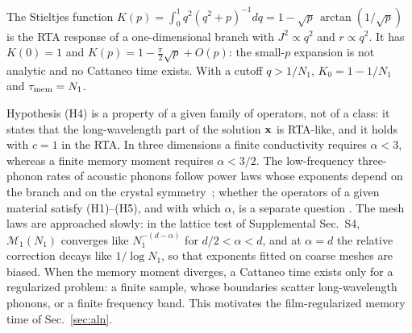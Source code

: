 \begin{example}\label{ex:ir}
The Stieltjes function
$K(p)=\int_0^1q^2(q^2+p)^{-1}dq=1-\sqrt p\,\arctan(1/\sqrt p)$ is the RTA response of a one-dimensional
branch with $J^2\propto q^2$ and $r\propto q^2$. It has $K(0)=1$ and $K(p)=1-\tfrac\pi2\sqrt p+O(p)$: the
small-$p$ expansion is not analytic and no Cattaneo time exists. With a cutoff $q>1/N_1$,
$K_0=1-1/N_1$ and $\tau_{\rm mem}=N_1$.
\end{example}

Hypothesis (H4) is a property of a given family of operators, not of a class: it states that the
long-wavelength part of the solution $\mathbf x$ is RTA-like, and it holds with $c=1$ in the RTA. In three
dimensions a finite conductivity requires $\alpha<3$, whereas a finite memory moment requires
$\alpha<3/2$. The low-frequency three-phonon rates of acoustic phonons follow power laws whose exponents
depend on the branch and on the crystal symmetry~\cite{Herring1954}; whether the operators of a given
material satisfy (H1)--(H5), and with which $\alpha$, is a separate question . The mesh laws
are approached slowly: in the lattice test of Supplemental Sec.~S4, $\mathcal M_1(N_1)$ converges like
$N_1^{-(d-\alpha)}$ for $d/2<\alpha<d$, and at $\alpha=d$ the relative correction decays like
$1/\log N_1$, so that exponents fitted on coarse meshes are biased. When the
memory moment diverges, a Cattaneo time exists only for a regularized problem: a finite sample, whose
boundaries scatter long-wavelength phonons, or a finite frequency band. This motivates the
film-regularized memory time of Sec.~\ref{sec:aln}.
